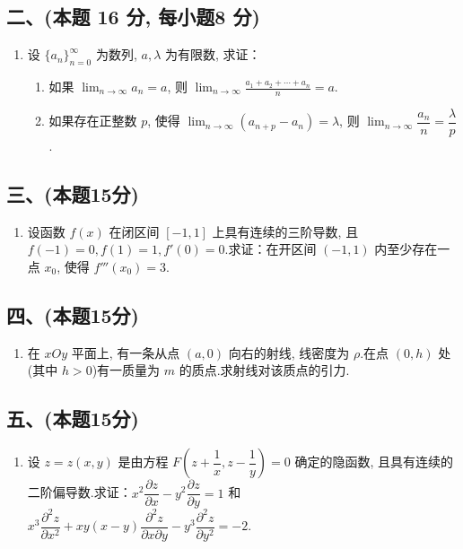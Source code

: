 \subsection*{二、(本题 16 分,  每小题8 分)}
\begin{enumerate}[start=5]
    \item 设 $\{a_n\}_{n=0}^{\infty}$ 为数列,  $a,  \lambda$ 为有限数,  求证：
          \begin{enumerate}
              \item [(1)] 如果 $\displaystyle\lim_{n \to \infty} a_n = a$,  则 $\displaystyle\lim_{n \to \infty} \frac{a_1 + a_2 + \cdots + a_n}{n} = a$.
              \item [(2)] 如果存在正整数 $p$,  使得 $\displaystyle\lim_{n \to \infty} (a_{n+p} - a_n) = \lambda$,  则 $\displaystyle\lim_{n \to \infty} \dfrac{a_n}{n} = \dfrac{\lambda}{p}$.
          \end{enumerate}
\end{enumerate}

\subsection*{三、(本题15分)}
\begin{enumerate}[start=6]
    \item 设函数 $f(x)$ 在闭区间 $[-1, 1]$ 上具有连续的三阶导数,  且 $f(-1) = 0,  f(1) = 1,  f'(0) = 0$.求证：在开区间 $(-1, 1)$ 内至少存在一点 $x_0$,  使得 $f'''(x_0) = 3$.
\end{enumerate}

\subsection*{四、(本题15分)}
\begin{enumerate}[start=7]
    \item 在 $xOy$ 平面上,  有一条从点 $(a, 0)$ 向右的射线,  线密度为 $\rho$.在点 $(0, h)$ 处(其中 $h > 0$)有一质量为 $m$ 的质点.求射线对该质点的引力.
\end{enumerate}

\subsection*{五、(本题15分)}
\begin{enumerate}[start=8]
    \item 设 $z = z(x,  y)$ 是由方程 $F\left(z + \dfrac{1}{x},  z - \dfrac{1}{y}\right) = 0$ 确定的隐函数,  且具有连续的二阶偏导数.求证：$x^2 \dfrac{\partial z}{\partial x} - y^2 \dfrac{\partial z}{\partial y} = 1$ 和 $x^3 \dfrac{\partial^2 z}{\partial x^2} + xy(x-y) \dfrac{\partial^2 z}{\partial x \partial y} - y^3 \dfrac{\partial^2 z}{\partial y^2} = -2$.
\end{enumerate}


